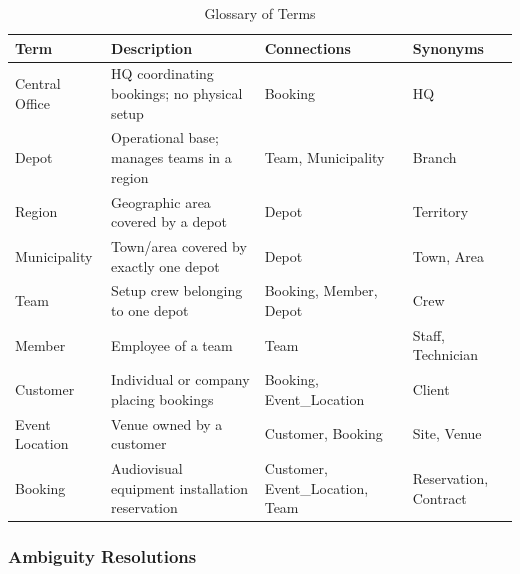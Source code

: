 \documentclass[12pt]{article}
\begin{document}
\begin{table}[H]
  \renewcommand{\arraystretch}{1.3}
  \begin{tabularx}{\textwidth}{|X|X|X|X|}
  \hline
  \textbf{Term} & \textbf{Description} & \textbf{Connections} & \textbf{Synonyms} \\ \hline
  Central Office     & HQ coordinating bookings; no physical setup & Booking & HQ \\ \hline
  Depot              & Operational base; manages teams in a region & Team, Municipality & Branch \\ \hline
  Region             & Geographic area covered by a depot & Depot & Territory \\ \hline
  Municipality       & Town/area covered by exactly one depot & Depot & Town, Area \\ \hline
  Team               & Setup crew belonging to one depot & Booking, Member, Depot & Crew \\ \hline
  Member             & Employee of a team & Team & Staff, Technician \\ \hline
  Customer           & Individual or company placing bookings & Booking, Event\_Location & Client \\ \hline
  Event Location     & Venue owned by a customer & Customer, Booking & Site, Venue \\ \hline
  Booking            & Audiovisual equipment installation reservation & Customer, Event\_Location, Team & Reservation, Contract \\ \hline
  \end{tabularx}
  \caption{Glossary of Terms}
\end{table}

\subsubsection{Ambiguity Resolutions}
\end{document}
